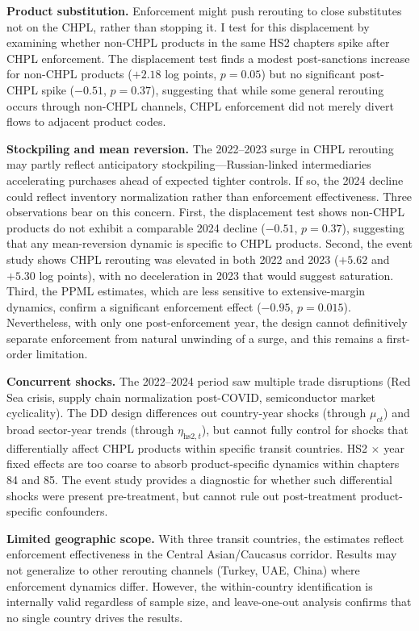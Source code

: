 \documentclass[12pt]{article}
\begin{document}
\textbf{Product substitution.} Enforcement might push rerouting to close substitutes not on the CHPL, rather than stopping it. I test for this displacement by examining whether non-CHPL products in the same HS2 chapters spike after CHPL enforcement. The displacement test finds a modest post-sanctions increase for non-CHPL products ($+2.18$ log points, $p = 0.05$) but no significant post-CHPL spike ($-0.51$, $p = 0.37$), suggesting that while some general rerouting occurs through non-CHPL channels, CHPL enforcement did not merely divert flows to adjacent product codes.

\textbf{Stockpiling and mean reversion.} The 2022--2023 surge in CHPL rerouting may partly reflect anticipatory stockpiling---Russian-linked intermediaries accelerating purchases ahead of expected tighter controls. If so, the 2024 decline could reflect inventory normalization rather than enforcement effectiveness. Three observations bear on this concern. First, the displacement test shows non-CHPL products do not exhibit a comparable 2024 decline ($-0.51$, $p = 0.37$), suggesting that any mean-reversion dynamic is specific to CHPL products. Second, the event study shows CHPL rerouting was elevated in both 2022 and 2023 ($+5.62$ and $+5.30$ log points), with no deceleration in 2023 that would suggest saturation. Third, the PPML estimates, which are less sensitive to extensive-margin dynamics, confirm a significant enforcement effect ($-0.95$, $p = 0.015$). Nevertheless, with only one post-enforcement year, the design cannot definitively separate enforcement from natural unwinding of a surge, and this remains a first-order limitation.

\textbf{Concurrent shocks.} The 2022--2024 period saw multiple trade disruptions (Red Sea crisis, supply chain normalization post-COVID, semiconductor market cyclicality). The DD design differences out country-year shocks (through $\mu_{ct}$) and broad sector-year trends (through $\eta_{\text{hs2},t}$), but cannot fully control for shocks that differentially affect CHPL products within specific transit countries. HS2 $\times$ year fixed effects are too coarse to absorb product-specific dynamics within chapters 84 and 85. The event study provides a diagnostic for whether such differential shocks were present pre-treatment, but cannot rule out post-treatment product-specific confounders.

\textbf{Limited geographic scope.} With three transit countries, the estimates reflect enforcement effectiveness in the Central Asian/Caucasus corridor. Results may not generalize to other rerouting channels (Turkey, UAE, China) where enforcement dynamics differ. However, the within-country identification is internally valid regardless of sample size, and leave-one-out analysis confirms that no single country drives the results.
\end{document}
